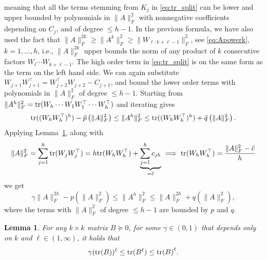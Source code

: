 \documentclass{article}
\makeatletter
\renewenvironment{proof}[1][\proofname]{
  \par\pushQED{\qed}\normalfont
  \topsep6\p@\@plus6\p@\relax
  \trivlist\item[\hskip\labelsep\bfseries#1\@addpunct{.}]
  \ignorespaces
}{
  \popQED\endtrivlist\@endpefalse
}
\newtheorem{lemma}[proposition]{Lemma}
\def\tr{{\rm tr}}
\newcommand{\1}{\mathds{1}}
\makeatother
\begin{document}
\begin{proof}
meaning that all the terms stemming from $K_j$ in \eqref{eq:tr_split} can be lower and upper bounded by polynomials in $ \lVert A \rVert^{2}_F$ with nonnegative coefficients depending on $C_j$, and of degree $\leq h-1$. In the previous formula, we have also used the fact that $\lVert A \rVert^{2k}_F \geq \lVert A^k \rVert^2_F \geq \lVert W_{\ell:k+\ell-1} \rVert^2_F$, see \eqref{eq:Apowerk}, $k=1,...,h$, i.e., $\lVert A \rVert^{2k}_F$ upper bounds the norm of any product of $k$ consecutive factors $W_\ell\cdots W_{k+\ell-1}$. The high order term in \eqref{eq:tr_split} is on the same form as the term on the left hand side. We can again substitute $W_{j+1}W_{j+1}^\top =W_{j+2}^\top W_{j+2}-C_{j+1}$, and bound the lower order terms with polynomials in $\lVert A \rVert^{2}_F$ of degree $\leq h-1$. Starting from $\lVert A^h \rVert^2_F = \tr{(W_h\cdots W_1W_1^\top \cdots W_h^\top )}$ and iterating gives
\begin{equation*}
	\tr{((W_hW_h^\top )^h)} -\tilde{p}\left(\lVert A \rVert^{2}_F\right) \leq \lVert A^h \rVert^2_F \leq  \tr{((W_hW_h^\top )^h)} + \tilde{q}\left(\lVert A \rVert^{2}_F\right).
\end{equation*}
Applying Lemma~\ref{lem:tracebound}, along with 
\begin{equation*}
	\lVert A \rVert^{2}_F = \sum_{j=1}^{h} \tr{(W_jW_j^\top )} = h\tr{(W_hW_h^\top )} + \underbrace{\sum_{j=1}^{h} c_{jh}}_{=\tilde{c}} \implies \tr{(W_hW_h^\top )} = \frac{ \lVert A \rVert^{2}_F - \tilde{c} }{h}
\end{equation*}
we get
\begin{equation*}
	\gamma\lVert A \rVert^{2h}_F - p\left(\lVert A \rVert^{2}_F\right) \leq \lVert A^h \rVert^2_F \leq  \lVert A \rVert^{2h}_F + q\left(\lVert A \rVert^{2}_F\right),
\end{equation*}
where the terms with $\lVert A \rVert^{2}_F$ of degree $\leq h-1$ are bounded by $p$ and $q$.
\end{proof}


\begin{lemma}
    \label{lem:tracebound}
    For any $k\times k$ matrix $B\succeq 0$, for some $\gamma\in(0,1)$ that depends only on $k$ and $\ell\in(1,\infty)$, it holds that
\begin{equation*}
	\gamma(\tr{(B)})^\ell \leq \tr{(B^\ell)}\leq \tr{(B)}^\ell.
\end{equation*}
\end{lemma}
\end{document}
